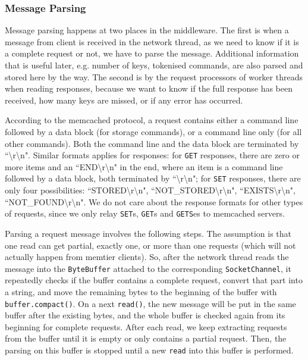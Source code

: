 \subsubsection{Message Parsing} \label{message_parsing}

Message parsing happens at two places in the middleware. The first is when a message from client is received in the network thread, as we need to know if it is a complete request or not, we have to parse the message. Additional information that is useful later, e.g. number of keys, tokenised commands, are also parsed and stored here by the way. The second is by the request processors of worker threads when reading responses, because we want to know if the full response has been received, how many keys are missed, or if any error has occurred. 

According to the memcached protocol, a request contains either a command line followed by a data block (for storage commands), or a command line only (for all other commands). Both the command line and the data block are terminated by ``\textbackslash r\textbackslash n". Similar formats applies for responses: for \texttt{GET} responses, there are zero or more items and an ``END\textbackslash r\textbackslash n" in the end, where an item is a command line followed by a data block, both terminated by ``\textbackslash r\textbackslash n"; for \texttt{SET} responses, there are only four possibilities: ``STORED\textbackslash r\textbackslash n", ``NOT\_STORED\textbackslash r\textbackslash n", ``EXISTS\textbackslash r\textbackslash n", ``NOT\_FOUND\textbackslash r\textbackslash n". We do not care about the response formats for other types of requests, since we only relay \texttt{SET}s, \texttt{GET}s and \texttt{GETS}es to memcached servers.

Parsing a request message involves the following steps. The assumption is that one read can get partial, exactly one, or more than one requests (which will not actually happen from memtier clients). So, after the network thread reads the message into the \texttt{ByteBuffer} attached to the corresponding \texttt{SocketChannel}, it repeatedly checks if the buffer contains a complete request, convert that part into a string, and move the remaining bytes to the beginning of the buffer with \texttt{buffer.compact()}. On a next \texttt{read()}, the new message will be put in the same buffer after the existing bytes, and the whole buffer is checked again from its beginning for complete requests. After each read, we keep extracting requests from the buffer until it is empty or only contains a partial request. Then, the parsing on this buffer is stopped until a new \texttt{read} into this buffer is performed.

